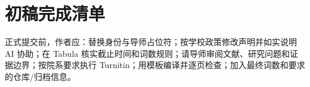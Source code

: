 \chapter{初稿完成清单}

正式提交前，作者应：替换身份与导师占位符；按学校政策修改声明并如实说明 AI 协助；在 Tabula 核实截止时间和词数规则；请导师审阅文献、研究问题和证据边界；按院系要求执行 Turnitin；用模板编译并逐页检查；加入最终词数和要求的仓库/归档信息。
